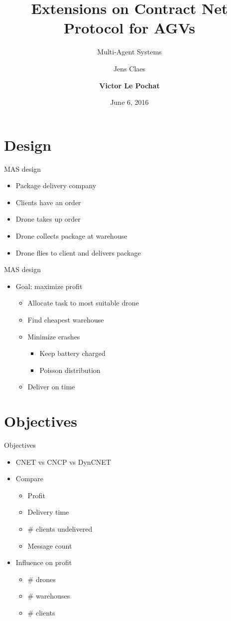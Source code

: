 \documentclass{beamer}
\title{Extensions on Contract Net Protocol for AGVs}
\subtitle{Multi-Agent Systems}
\author{Jens Claes \and \textbf{Victor Le Pochat}}
\date{June 6, 2016}
\begin{document}
	\frame{\titlepage}

	\section{Design}
	
	\begin{frame}{MAS design}
		\begin{itemize}
			\item Package delivery company
			\item Clients have an order
			\item Drone takes up order
			\item Drone collects package at warehouse
			\item Drone flies to client and delivers package
		\end{itemize}
	\end{frame}
	
	\begin{frame}{MAS design}
		\begin{itemize}
			\item Goal: maximize profit
			\begin{itemize}
				\item Allocate task to most suitable drone
				\item Find cheapest warehouse
				\item Minimize crashes
				\begin{itemize}
					\item Keep battery charged
					\item Poisson distribution
				\end{itemize}
				\item Deliver on time
			\end{itemize}
		\end{itemize}
	\end{frame}

	\section{Objectives}
	
	\begin{frame}{Objectives}
		\begin{itemize}
		\item CNET vs CNCP vs DynCNET
		\item Compare
			\begin{itemize}
			\item Profit
			\item Delivery time
			\item \# clients undelivered
			\item Message count
			\end{itemize}
		\item Influence on profit
			\begin{itemize}
			\item \# drones
			\item \# warehouses
			\item \# clients
			\end{itemize}
		\end{itemize}
	\end{frame}
		
\end{document}
